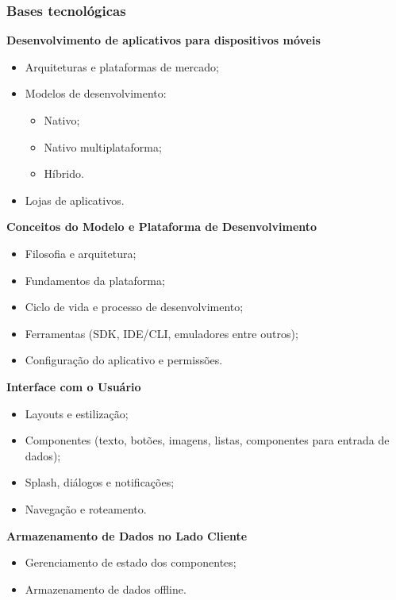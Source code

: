 \begin{frame}[allowframebreaks]
	\frametitle{Bases tecnológicas}
	
	\par \textbf{Desenvolvimento de aplicativos para dispositivos móveis}
	
	\begin{itemize}
		\item Arquiteturas e plataformas de mercado;
		\item Modelos de desenvolvimento:
		\begin{itemize}
			\item Nativo;
			\item Nativo multiplataforma;
			\item Híbrido.
		\end{itemize}
		\item Lojas de aplicativos.
	\end{itemize}
	
	\par \textbf{Conceitos do Modelo e Plataforma de Desenvolvimento}
	
	\begin{itemize}
		\item Filosofia e arquitetura;
		\item Fundamentos da plataforma;
		\item Ciclo de vida e processo de desenvolvimento;
		\item Ferramentas (SDK, IDE/CLI, emuladores entre outros);
		\item Configuração do aplicativo e permissões.
	\end{itemize}
	
	\par \textbf{Interface com o Usuário}
	
	\begin{itemize}
		\item Layouts e estilização;
		\item Componentes (texto, botões, imagens, listas, componentes para entrada de dados);
		\item Splash, diálogos e notificações;
		\item Navegação e roteamento.
	\end{itemize}
	
	\par \textbf{Armazenamento de Dados no Lado Cliente}
	
	\begin{itemize}
		\item Gerenciamento de estado dos componentes;
		\item Armazenamento de dados offline.
	\end{itemize}
\end{frame}